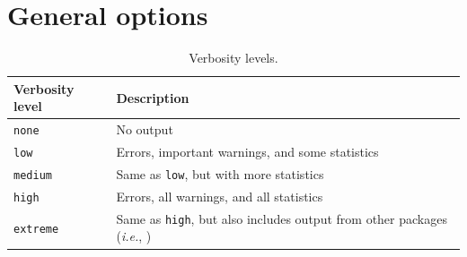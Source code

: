 \section{General options}
\label{sec:options_general}

\begin{table}[h!]
  \begin{center}
    \begin{tabular}{p{3cm} p{12cm}}
      \toprule
      Verbosity level           & Description \\
      \midrule
      \verb!none!               & No output \\
      \verb!low!                & Errors, important warnings, and some statistics \\
      \verb!medium!             & Same as \verb!low!, but with more statistics \\
      \verb!high!               & Errors, all warnings, and all statistics \\
      \verb!extreme!            & Same as \verb!high!, but also includes output from other packages (\textit{i.e.}, \zoltan{}) \\
      \bottomrule
    \end{tabular}
    \caption{Verbosity levels.}
\label{t:verbosity_types}
  \end{center}
\end{table}

